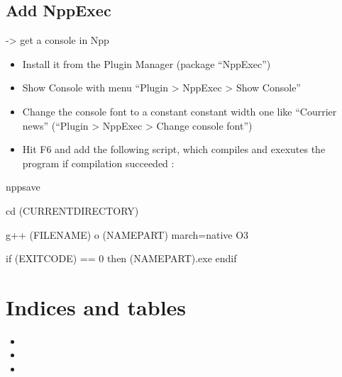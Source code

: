 \documentclass[letterpaper,10pt,english]{sphinxmanual}
\begin{document}


\section{Add NppExec}
\label{\detokenize{index:add-nppexec}}
-\textgreater{} get a console in Npp
\begin{itemize}
\item {} 
Install it from the Plugin Manager (package “NppExec”)

\item {} 
Show Console with menu “Plugin \textgreater{} NppExec \textgreater{} Show Console”

\item {} 
Change the console font to a constant constant width one like “Courrier news” (“Plugin \textgreater{} NppExec \textgreater{} Change console font”)

\item {} 
Hit F6 and add the following script, which compiles and exexutes the program if compilation succeeded :

\end{itemize}

%
\begin{sphinxVerbatim}[commandchars=\\\{\}]
npp\PYGZus{}save

cd \PYGZdq{}\PYGZdl{}(CURRENT\PYGZus{}DIRECTORY)\PYGZdq{}

g++ \PYGZdq{}\PYGZdl{}(FILE\PYGZus{}NAME)\PYGZdq{} \PYGZhy{}o \PYGZdl{}(NAME\PYGZus{}PART) \PYGZhy{}march=native \PYGZhy{}O3

if \PYGZdl{}(EXITCODE) == 0  then
\PYGZdl{}(NAME\PYGZus{}PART).exe
endif
\end{sphinxVerbatim}


\chapter{Indices and tables}
\label{\detokenize{index:indices-and-tables}}\begin{itemize}
\item {} 

\item {} 

\item {} 

\end{itemize}



\renewcommand{\indexname}{Index}
\printindex
\end{document}

